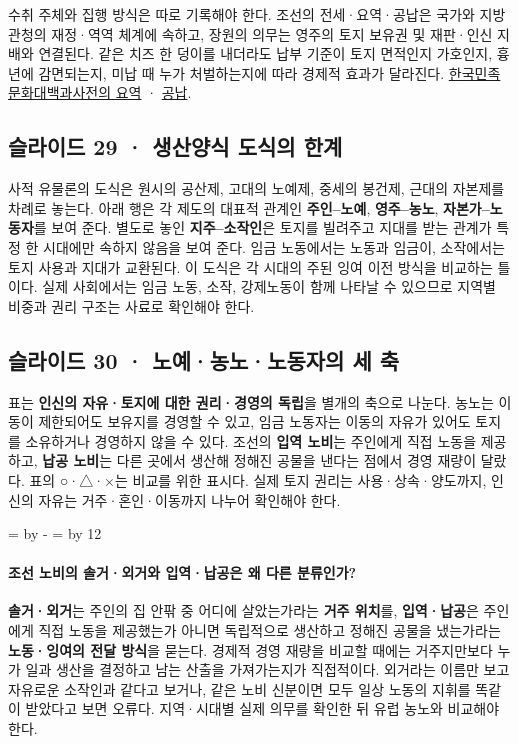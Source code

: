 \documentclass[10pt,a4paper]{article}
\newcommand{\ReserveQuestionSpace}{%
  \par\begingroup
  \dimen0=\pagegoal \advance\dimen0 by -\pagetotal
  \dimen2=\baselineskip \multiply\dimen2 by 12
  \ifdim\dimen0<\dimen2 \newpage\fi
  \endgroup}
\begin{document}
수취 주체와 집행 방식은 따로 기록해야 한다. 조선의 전세·요역·공납은 국가와 지방 관청의 재정·역역 체계에 속하고, 장원의 의무는 영주의 토지 보유권 및 재판·인신 지배와 연결된다. 같은 치즈 한 덩이를 내더라도 납부 기준이 토지 면적인지 가호인지, 흉년에 감면되는지, 미납 때 누가 처벌하는지에 따라 경제적 효과가 달라진다. \href{https://encykorea.aks.ac.kr/Article/E0039335}{한국민족문화대백과사전의 요역} · \href{https://encykorea.aks.ac.kr/Article/E0004251}{공납}.\par

\subsection{슬라이드 29 · 생산양식 도식의 한계}
사적 유물론의 도식은 원시의 공산제, 고대의 노예제, 중세의 봉건제, 근대의 자본제를 차례로 놓는다. 아래 행은 각 제도의 대표적 관계인 \textbf{주인–노예}, \textbf{영주–농노}, \textbf{자본가–노동자}를 보여 준다. 별도로 놓인 \textbf{지주–소작인}은 토지를 빌려주고 지대를 받는 관계가 특정 한 시대에만 속하지 않음을 보여 준다. 임금 노동에서는 노동과 임금이, 소작에서는 토지 사용과 지대가 교환된다. 이 도식은 각 시대의 주된 잉여 이전 방식을 비교하는 틀이다. 실제 사회에서는 임금 노동, 소작, 강제노동이 함께 나타날 수 있으므로 지역별 비중과 권리 구조는 사료로 확인해야 한다.\par

\subsection{슬라이드 30 · 노예·농노·노동자의 세 축}
표는 \textbf{인신의 자유·토지에 대한 권리·경영의 독립}을 별개의 축으로 나눈다. 농노는 이동이 제한되어도 보유지를 경영할 수 있고, 임금 노동자는 이동의 자유가 있어도 토지를 소유하거나 경영하지 않을 수 있다. 조선의 \textbf{입역 노비}는 주인에게 직접 노동을 제공하고, \textbf{납공 노비}는 다른 곳에서 생산해 정해진 공물을 낸다는 점에서 경영 재량이 달랐다. 표의 ○·△·×는 비교를 위한 표시다. 실제 토지 권리는 사용·상속·양도까지, 인신의 자유는 거주·혼인·이동까지 나누어 확인해야 한다.\par

\ReserveQuestionSpace
\paragraph{조선 노비의 솔거·외거와 입역·납공은 왜 다른 분류인가?}
\textbf{솔거·외거}는 주인의 집 안팎 중 어디에 살았는가라는 \textbf{거주 위치}를, \textbf{입역·납공}은 주인에게 직접 노동을 제공했는가 아니면 독립적으로 생산하고 정해진 공물을 냈는가라는 \textbf{노동·잉여의 전달 방식}을 묻는다. 경제적 경영 재량을 비교할 때에는 거주지만보다 누가 일과 생산을 결정하고 남는 산출을 가져가는지가 직접적이다. 외거라는 이름만 보고 자유로운 소작인과 같다고 보거나, 같은 노비 신분이면 모두 일상 노동의 지휘를 똑같이 받았다고 보면 오류다. 지역·시대별 실제 의무를 확인한 뒤 유럽 농노와 비교해야 한다.\par
\end{document}
